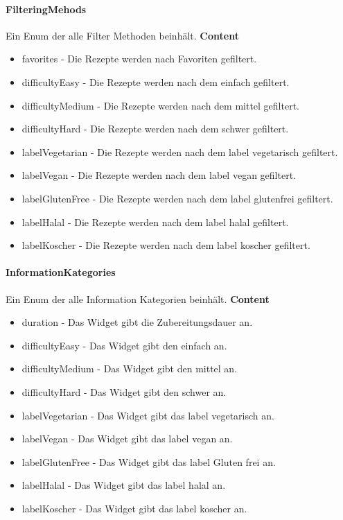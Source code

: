 \documentclass[parskip=full]{scrartcl}
\begin{document}
\paragraph{FilteringMehods}
Ein Enum der alle Filter Methoden beinhält.
\textbf{Content}
\begin{itemize}
    \item favorites - Die Rezepte werden nach Favoriten gefiltert.
    \item difficultyEasy - Die Rezepte werden nach dem  einfach gefiltert.
    \item difficultyMedium - Die Rezepte werden nach dem  mittel gefiltert.
    \item difficultyHard - Die Rezepte werden nach dem  schwer gefiltert.
    \item labelVegetarian - Die Rezepte werden nach dem \gls{label} vegetarisch gefiltert.
    \item labelVegan - Die Rezepte werden nach dem \gls{label} vegan gefiltert.
    \item labelGlutenFree - Die Rezepte werden nach dem \gls{label} glutenfrei gefiltert.
    \item labelHalal - Die Rezepte werden nach dem \gls{label} halal gefiltert.
    \item labelKoscher - Die Rezepte werden nach dem \gls{label} koscher gefiltert.
\end{itemize}

\paragraph{InformationKategories} 
    \label{sec:InformationKategories}
Ein Enum der alle Information Kategorien beinhält.
\textbf{Content}
\begin{itemize}
    \item duration - Das Widget gibt die Zubereitungsdauer an.
    \item difficultyEasy - Das Widget gibt den  einfach an.
    \item difficultyMedium - Das Widget gibt den  mittel an.
    \item difficultyHard - Das Widget gibt den  schwer an.
    \item labelVegetarian - Das Widget gibt das \gls{label} vegetarisch an.
    \item labelVegan - Das Widget gibt das \gls{label} vegan an.
    \item labelGlutenFree - Das Widget gibt das \gls{label} Gluten frei an.
    \item labelHalal - Das Widget gibt das \gls{label} halal an.
    \item labelKoscher - Das Widget gibt das \gls{label} koscher an.
\end{itemize}
\end{document}
